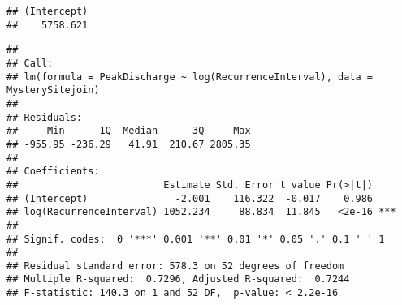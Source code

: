 \documentclass[]{article}
\newenvironment{Shaded}{\begin{snugshade}}{\end{snugshade}}
\newcommand{\CommentTok}[1]{\textcolor[rgb]{0.56,0.35,0.01}{\textit{#1}}}
\newcommand{\DataTypeTok}[1]{\textcolor[rgb]{0.13,0.29,0.53}{#1}}
\newcommand{\DecValTok}[1]{\textcolor[rgb]{0.00,0.00,0.81}{#1}}
\newcommand{\KeywordTok}[1]{\textcolor[rgb]{0.13,0.29,0.53}{\textbf{#1}}}
\newcommand{\NormalTok}[1]{#1}
\newcommand{\OperatorTok}[1]{\textcolor[rgb]{0.81,0.36,0.00}{\textbf{#1}}}
\newcommand{\StringTok}[1]{\textcolor[rgb]{0.31,0.60,0.02}{#1}}
\begin{document}
\begin{Shaded}
\end{Shaded}

\begin{verbatim}
## (Intercept) 
##    5758.621
\end{verbatim}

\begin{Shaded}
\end{Shaded}

\begin{verbatim}
## 
## Call:
## lm(formula = PeakDischarge ~ log(RecurrenceInterval), data = MysterySitejoin)
## 
## Residuals:
##     Min      1Q  Median      3Q     Max 
## -955.95 -236.29   41.91  210.67 2805.35 
## 
## Coefficients:
##                         Estimate Std. Error t value Pr(>|t|)    
## (Intercept)               -2.001    116.322  -0.017    0.986    
## log(RecurrenceInterval) 1052.234     88.834  11.845   <2e-16 ***
## ---
## Signif. codes:  0 '***' 0.001 '**' 0.01 '*' 0.05 '.' 0.1 ' ' 1
## 
## Residual standard error: 578.3 on 52 degrees of freedom
## Multiple R-squared:  0.7296, Adjusted R-squared:  0.7244 
## F-statistic: 140.3 on 1 and 52 DF,  p-value: < 2.2e-16
\end{verbatim}

\begin{Shaded}
\end{Shaded}
\end{document}
